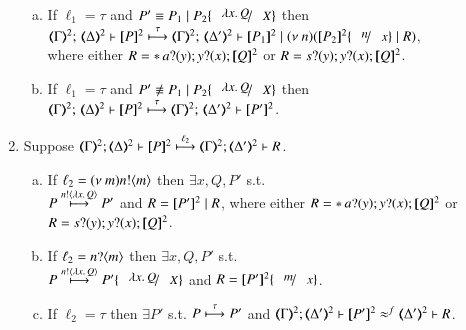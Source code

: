 \begin{proposition}
\begin{enumerate}[1.]
\begin{enumerate}[a)]
		\item	 
			If  
			$\ell_1 = \tau$ and $P' 	\scong P_1 \Par P_2\subst{\abs{x}Q}{X}$
			then \\
			$\mapt{\Gamma}^{2};\, \mapt{\Delta}^{2} \proves  \map{P}^{2}
			\hby{\tau}
			\mapt{\Gamma}^{2};\, \mapt{\Delta'}^{2} \proves  \map{P_1}^{2} \Par \news{n}
			(\map{P_2}^{2}\subst{n}{x} \Par R)$, \\
			where 
			either
			$R = \ast\,{} a ? (y) ; y ? (x) ; [\!\![Q]\!\!]^{2}$ 
			or $R = s ? (y) ; y ? (x) ; [\!\![Q]\!\!]^{2}$.


		\item	 
			If  
			$\ell_1 = \tau$ and $P' 	\not \scong P_1 \Par P_2\subst{\abs{x}Q}{X}$
			then \\
			$\mapt{\Gamma}^{2};\, \mapt{\Delta}^{2} \proves  \map{P}^{2}
			\hby{\tau}
			\mapt{\Gamma}^{2};\, \mapt{\Delta'}^{2} \proves  \map{P'}^{2}$.
			
				   			   
		\end{enumerate}
		\item Suppose 
		$\stytra{\mapt{\Gamma}^{2}}{\ell_2}{\mapt{\Delta}^{2}}{\map{P}^{2}}{\mapt{\Delta'}^{2}}{R}$.
		\begin{enumerate}[a)]
		\item
			If  
			$\ell_2 = (\nu\ m)n ! \langle m \rangle$
			then $\exists x, Q, P'$ s.t. \\
			$P \stackrel{n ! \langle \lambda x.\,Q \rangle}{\longmapsto} P'$
			and $R = [\!\![P']\!\!]^{2} \;|\; R$, where 
			either
			$R = \ast\,{} a ? (y) ; y ? (x) ; [\!\![Q]\!\!]^{2}$ 
			or $R = s ? (y) ; y ? (x) ; [\!\![Q]\!\!]^{2}$.

		\item   
			If  $\ell_2 = n ? \langle m \rangle$ 
			then $\exists x, Q, P'$ s.t. \\
			$P \hby{\bactout{n}{\abs{x}Q}} P'\subst{\abs{x}Q}{X}$
			and $R = \map{P'}^{2}\subst{m}{x}$.
		
		\item   
			If  %
			$\ell_2 = \tau$ 
			then $\exists P'$ s.t.
			$P \stackrel{\tau}{\longmapsto} P'$
			and $\horel{\mapt{\Gamma}^{2}}{\mapt{\Delta'}^{2}}{\map{P'}^{2}}{\wbf}{\mapt{\Delta'}^{2}}{R}$.
	\end{enumerate}
	\end{enumerate}
\end{proposition}

